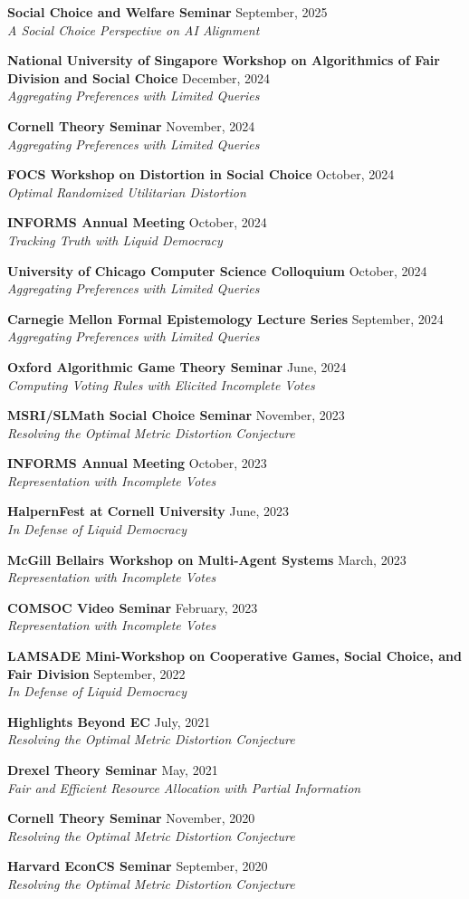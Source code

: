 \documentclass{article}
\newcommand{\talk}[3]{\needspace{2\baselineskip}\textbf{#1} \hfill #2 \\\textit{#3}}
\begin{document}
\talk{Social Choice and Welfare Seminar}{September, 2025}{A Social Choice Perspective on AI Alignment}

\talk{National University of Singapore Workshop on Algorithmics of Fair Division and Social Choice}{December, 2024}{Aggregating Preferences with Limited Queries}

\talk{Cornell Theory Seminar}{November, 2024}{Aggregating Preferences with Limited Queries}

\talk{FOCS Workshop on Distortion in Social Choice}{October, 2024}{Optimal Randomized Utilitarian Distortion}

\talk{INFORMS Annual Meeting}{October, 2024}{Tracking Truth with Liquid Democracy}

\talk{University of Chicago Computer Science Colloquium}{October, 2024}{Aggregating Preferences with Limited Queries}

\talk{Carnegie Mellon Formal Epistemology Lecture Series}{September, 2024}{Aggregating Preferences with Limited Queries}

\talk{Oxford Algorithmic Game Theory Seminar}{June, 2024}{Computing Voting Rules with Elicited Incomplete Votes}

\talk{MSRI/SLMath Social Choice Seminar}{November, 2023}{Resolving the Optimal Metric Distortion Conjecture}

\talk{INFORMS Annual Meeting}{October, 2023}{Representation with Incomplete Votes}

\talk{HalpernFest at Cornell University}{June, 2023}{In Defense of Liquid Democracy}

\talk{McGill Bellairs Workshop on Multi-Agent Systems}{March, 2023}{Representation with Incomplete Votes}

\talk{COMSOC Video Seminar}{February, 2023}{Representation with Incomplete Votes}

\talk{LAMSADE Mini-Workshop on Cooperative Games, Social Choice, and Fair Division}{September, 2022}{In Defense of Liquid Democracy}

\talk{Highlights Beyond EC}{July, 2021}{Resolving the Optimal Metric Distortion Conjecture}

\talk{Drexel Theory Seminar}{May, 2021}{Fair and Efficient Resource Allocation with Partial Information}

\talk{Cornell Theory Seminar}{November, 2020}{Resolving the Optimal Metric Distortion Conjecture}

\talk{Harvard EconCS Seminar}{September, 2020}{Resolving the Optimal Metric Distortion Conjecture}
\end{document}
